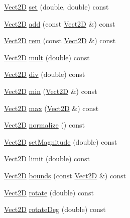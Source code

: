 \begin{DoxyCompactItemize}
\item 
\hyperlink{classVect2D}{Vect2D} \hyperlink{classVect2D_a8bf790204c1b93b6569cbe8eb5fd1e0f_a8bf790204c1b93b6569cbe8eb5fd1e0f}{set} (double, double) const
\item 
\hyperlink{classVect2D}{Vect2D} \hyperlink{classVect2D_abae2f22236c825a3fb1dfdc434ae1f45_abae2f22236c825a3fb1dfdc434ae1f45}{add} (const \hyperlink{classVect2D}{Vect2D} \&) const
\item 
\hyperlink{classVect2D}{Vect2D} \hyperlink{classVect2D_a7986c5c040e6ba8ad2e44bdbdd6177b6_a7986c5c040e6ba8ad2e44bdbdd6177b6}{rem} (const \hyperlink{classVect2D}{Vect2D} \&) const
\item 
\hyperlink{classVect2D}{Vect2D} \hyperlink{classVect2D_ac7672052c102f5ee2e4f4582af27264e_ac7672052c102f5ee2e4f4582af27264e}{mult} (double) const
\item 
\hyperlink{classVect2D}{Vect2D} \hyperlink{classVect2D_a0abf4b83be014c545a7a90a0ea165632_a0abf4b83be014c545a7a90a0ea165632}{div} (double) const
\item 
\hyperlink{classVect2D}{Vect2D} \hyperlink{classVect2D_a7c7e91d06c0cebad78acf57664ff3207_a7c7e91d06c0cebad78acf57664ff3207}{min} (\hyperlink{classVect2D}{Vect2D} \&) const
\item 
\hyperlink{classVect2D}{Vect2D} \hyperlink{classVect2D_a16316306d609d1e7594f747632ada546_a16316306d609d1e7594f747632ada546}{max} (\hyperlink{classVect2D}{Vect2D} \&) const
\item 
\hyperlink{classVect2D}{Vect2D} \hyperlink{classVect2D_a81341d9ac6fae20c826302a547b0996d_a81341d9ac6fae20c826302a547b0996d}{normalize} () const
\item 
\hyperlink{classVect2D}{Vect2D} \hyperlink{classVect2D_a0144b24b02992650fe84a6f8d6bcbfb5_a0144b24b02992650fe84a6f8d6bcbfb5}{set\+Magnitude} (double) const
\item 
\hyperlink{classVect2D}{Vect2D} \hyperlink{classVect2D_a1a3e45f232ff6e5a4f2894100c5246bf_a1a3e45f232ff6e5a4f2894100c5246bf}{limit} (double) const
\item 
\hyperlink{classVect2D}{Vect2D} \hyperlink{classVect2D_a2c297e74ea6bc349ba3b31793b11404b_a2c297e74ea6bc349ba3b31793b11404b}{bounds} (const \hyperlink{classVect2D}{Vect2D} \&) const
\item 
\hyperlink{classVect2D}{Vect2D} \hyperlink{classVect2D_a436ad92b224172b8bed995bade778126_a436ad92b224172b8bed995bade778126}{rotate} (double) const
\item 
\hyperlink{classVect2D}{Vect2D} \hyperlink{classVect2D_ab02782179e127d49dc292504b498b6b6_ab02782179e127d49dc292504b498b6b6}{rotate\+Deg} (double) const

\end{DoxyCompactItemize}
